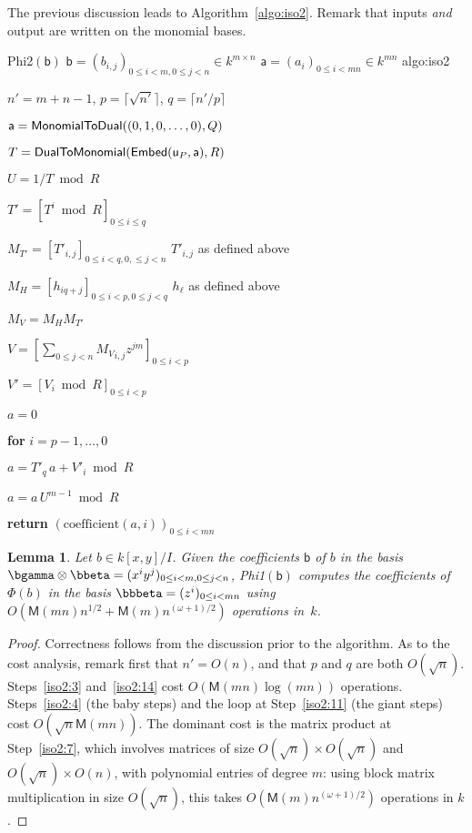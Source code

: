 \documentclass{sig-alternate}
\def\M {\ensuremath{\mathsf{M}}}
\def\va {\ensuremath{\mathsf{a}}}
\def\vy {\ensuremath{\mathsf{a}}}
\def\vu {\ensuremath{\mathsf{u}}}
\def\vb {\ensuremath{\mathsf{b}}}
\def\coeff {\ensuremath{\mathrm{coefficient}}}
\newcounter{algo}
\newenvironment{algorithm_endline}[4]{\small\begin{center}\begin{minipage}{0.48\textwidth}
      \refstepcounter{algo}
      \label{#4}
      \sf
      \rule{\textwidth}{0.2pt}\\
      \makebox[\textwidth][c]{Algorithm~\arabic{algo}:~\textbf{#1}}\\
      \rule[0.5\baselineskip]{\textwidth}{0.2pt}\\

      \vspace{-12pt}

      \parbox{\textwidth}{\textbf{Input} #2}
      \parbox{\textwidth}{\textbf{Output} #3}

\vspace{-7pt}

      \begin{enumerate*}}{\end{enumerate*}
      \vspace{-11pt}
      \rule{\textwidth}{0.2pt}
\end{minipage}\end{center}
}
\newtheorem{Lemma}{Lemma}
\begin{document}
The previous discussion leads to Algorithm~\ref{algo:iso2}. Remark
that inputs {\em and} output are written on the monomial bases.

\begin{algofloat}
  \begin{algorithm_endline}
{Phi2$(\vb)$}      
{$\vb = (b_{i,j})_{0 \le i < m, 0 \le j < n} \in k^{m \times n}$}
{$\va = (a_{i})_{0 \le i < mn} \in k^{m n}$}
{algo:iso2}
\item $n'=m+n-1$, $p=\lceil \sqrt {n'} \rceil$, $q=\lceil n'/p\rceil$
\item $\vy={\sf MonomialToDual}((0,1,0,\dots,0),Q)$ 
\item \label{iso2:2} $T={\sf DualToMonomial}({\sf Embed}(\vu_P, \vy), R)$
\item \label{iso2:3} $U=1/T \bmod R$
\item \label{iso2:4} $T'=[T^i \bmod R]_{0 \le i \le q}$
\item $M_{T'}=[T'_{i,j}]_{0\le i < q, 0, \le j < n}$ \hfill $T'_{i,j}$ as defined above
\item $M_H=[h_{iq+j}]_{0 \le i <p, 0 \le j < q}$ \hfill $h_\ell$ as defined above
\item \label{iso2:7} $M_V = M_H M_{T'}$
\item $V=[\sum_{0 \le j <n} {M_V}_{i,j} z^{jm} ]_{0 \le i <p}$
\item $V'=[V_i \bmod R]_{0 \le i <p}$
\item $a=0$
\item {\bf for} {$i=p-1,\dots,0$}\label{iso2:11}
\item \hspace{7mm} $a=T'_q\, a+V'_i \bmod R$
\item \label{iso2:14} $a=a\, U^{m-1} \bmod R$
\item {\bf return} $(\coeff(a,i))_{0 \le i < mn}$
  \end{algorithm_endline}
\vspace{-5ex}
\end{algofloat}

\begin{Lemma}
  Let $b \in k[x,y]/I$. Given the coefficients $\vb$ of $b$ in the
  basis $\bgamma \otimes \bbeta=(x^i y^j)_{0 \le i < m, 0 \le j < n}$,
  {\sf Phi1}$(\vb)$ computes the coefficients of $\Phi(b)$ in the
  basis $\bbbeta=(z^i)_{0 \le i < mn}$ using $O(\M(mn)n^{1/2}+\M(m)
  n^{(\omega+1)/2} )$ operations in~$k$.
\end{Lemma}
\begin{proof}
  Correctness follows from the discussion prior to the algorithm.  As
  to the cost analysis, remark first that $n'=O(n)$, and that $p$ and
  $q$ are both $O(\sqrt{n})$. Steps~\ref{iso2:3} and~\ref{iso2:14}
  cost $O(\M(mn)\log(mn))$ operations. Steps~\ref{iso2:4} (the baby
  steps) and the loop at Step~\ref{iso2:11} (the giant steps) cost
  $O(\sqrt{n}\M(mn))$. The dominant cost is the matrix product at
  Step~\ref{iso2:7}, which involves matrices of size $O(\sqrt{n})
  \times O(\sqrt{n})$ and $O(\sqrt{n}) \times O(n)$, with polynomial
  entries of degree $m$: using block matrix multiplication in size
  $O(\sqrt{n})$, this takes $O(\M(m) n^{(\omega+1)/2})$ operations in
  $k$.
\end{proof}
\end{document}
